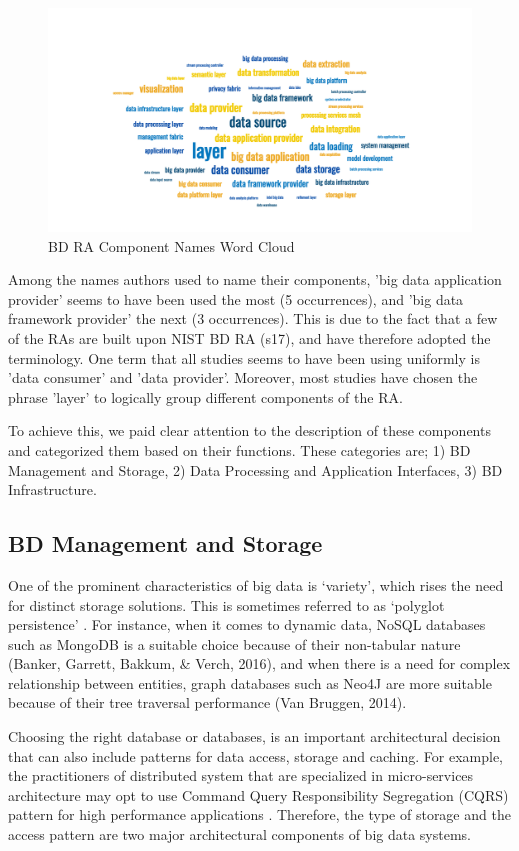 \documentclass[review]{elsarticle}
\begin{document}
\begin{figure}[h]
    \includegraphics[width=12cm]{wordcloud.png}
    \caption{BD RA Component Names Word Cloud}
    \label{image:word-cloud}
\end{figure}

Among the names authors used to name their components, 'big data application provider' seems to have been used the most (5 occurrences), and 'big data framework provider' the next (3 occurrences). This is due to the fact  that a few of the RAs are built upon NIST BD RA (s17), and have therefore adopted the terminology. One term that all studies seems to have been using uniformly is 'data consumer' and 'data provider'. Moreover, most studies have chosen the phrase 'layer' to logically group different components of the RA.

To achieve this, we paid clear attention to the description of these components and categorized them based on their functions. These categories are; 1) BD Management and Storage, 2) Data Processing and Application Interfaces, 3) BD Infrastructure.

\subsection{BD Management and Storage}

One of the prominent characteristics of big data is ‘variety’, which rises the need for distinct storage solutions. This is sometimes referred to as ‘polyglot persistence’ \cite{khine2019review}. For instance, when it comes to dynamic data, NoSQL databases such as MongoDB is a suitable choice because of their non-tabular nature (Banker, Garrett, Bakkum, \& Verch, 2016), and when there is a need for complex relationship between entities, graph databases such as Neo4J are more suitable because of their tree traversal performance (Van Bruggen, 2014). 

Choosing the right database or databases, is an important architectural decision that can also include patterns for data access, storage and caching. For example, the practitioners of distributed system that are specialized in micro-services architecture may opt to use Command Query Responsibility Segregation (CQRS) pattern for high performance applications \cite{marquez2018actual}. Therefore, the type of storage and the access pattern are two major architectural components of big data systems. 
\end{document}
